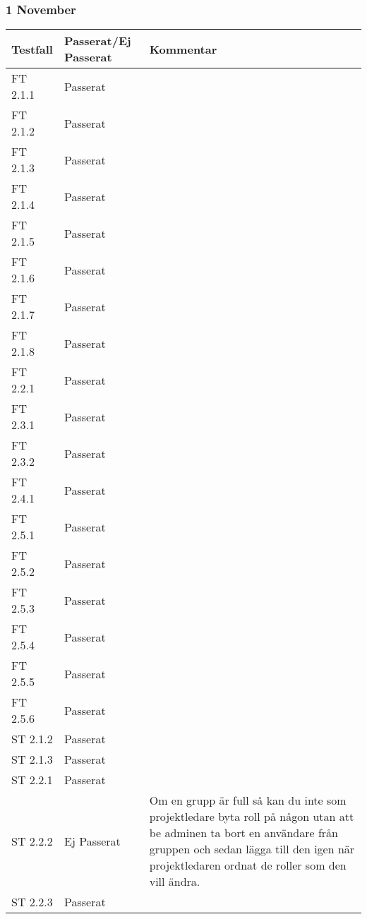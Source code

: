 \documentclass[a4paper]{article}
\begin{document}
\subsubsection{1 November}
\begin{tabular}{| l | l | p{9cm} |}
\hline
Testfall &  Passerat/Ej Passerat & Kommentar\\
\hline
FT 2.1.1 & Passerat & \\
\hline
FT 2.1.2 & Passerat & \\
\hline
FT 2.1.3 & Passerat & \\
\hline
FT 2.1.4 & Passerat & \\
\hline
FT 2.1.5 & Passerat & \\
\hline
FT 2.1.6 & Passerat & \\
\hline
FT 2.1.7 & Passerat & \\
\hline
FT 2.1.8 & Passerat & \\
\hline
FT 2.2.1 & Passerat & \\
\hline
FT 2.3.1 & Passerat & \\
\hline
FT 2.3.2 & Passerat & \\
\hline
FT 2.4.1 & Passerat & \\
\hline
FT 2.5.1 & Passerat & \\
\hline
FT 2.5.2 & Passerat & \\
\hline
FT 2.5.3 & Passerat & \\
\hline
FT 2.5.4 & Passerat & \\
\hline
FT 2.5.5 & Passerat & \\
\hline
FT 2.5.6 & Passerat & \\
\hline
ST 2.1.2 & Passerat & \\
\hline
ST 2.1.3 & Passerat & \\
\hline
ST 2.2.1 & Passerat & \\
\hline
ST 2.2.2 & Ej Passerat & Om en grupp är full så kan du inte som projektledare byta roll på någon utan att be adminen ta bort en användare från gruppen och sedan lägga till den igen när projektledaren ordnat de roller som den vill ändra.\\
\hline
ST 2.2.3 & Passerat & \\
\hline
\end{tabular}





\end{document}
